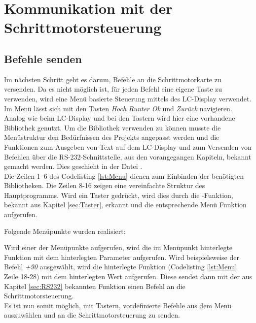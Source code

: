 \section{Kommunikation mit der Schrittmotorsteuerung}
\label{sec:Komm_SM}
\subsection{Befehle senden}
\label{sec:menu}
Im nächsten Schritt geht es darum, Befehle an die Schrittmotorkarte zu versenden. Da es nicht möglich ist, für jeden Befehl eine eigene Taste zu verwenden, 
wird eine Menü basierte Steuerung mittels des LC-Display verwendet. Im Menü lässt sich mit den Tasten \emph{Hoch} \emph{Runter} \emph{Ok} und \emph{Zurück} navigieren.\\
Analog wie beim LC-Display und bei den Tastern wird hier eine vorhandene Bibliothek genutzt. Um die Bibliothek verwenden zu können musste die Menüstruktur den Bedürfnissen des Projekts angepasst werden und die Funktionen zum Ausgeben von Text auf dem LC-Display und zum Versenden von Befehlen über die RS-232-Schnittstelle, aus den vorangegangen Kapiteln, bekannt gemacht werden. Dies geschieht in der Datei .\\
Die Zeilen 1--6 des Codelisting \ref{lst:Menu} dienen zum Einbinden der benötigten Bibliotheken. Die Zeilen 8-16 zeigen eine vereinfachte Struktur des Hauptprogramms. Wird ein Taster gedrückt, wird dies durch die -Funktion, bekannt aus Kapitel \ref{sec:Taster}, erkannt und die entsprechende Menü Funktion aufgerufen.
\lstset{language=C, basicstyle=\footnotesize, showstringspaces=false, tabsize=8}

Folgende Menüpunkte wurden realisiert:
\lstset{language=C, basicstyle=\footnotesize, showstringspaces=false, tabsize=8}

Wird einer der Menüpunkte aufgerufen, wird die im Menüpunkt hinterlegte Funktion mit dem hinterlegten Parameter aufgerufen. Wird beispielsweise der Befehl \emph{+90} ausgewählt, wird die hinterlegte Funktion (Codelisting \ref{lst:Menu} Zeile 18-28) mit dem hinterlegten Wert aufgerufen. Diese sendet dann mit der aus Kapitel \ref{sec:RS232} bekannten Funktion  einen Befehl an die Schrittmotorsteuerung.\\
Es ist nun somit möglich, mit Tastern, vordefinierte Befehle aus dem Menü auszuwählen und an die Schrittmotorsteuerung zu senden.
